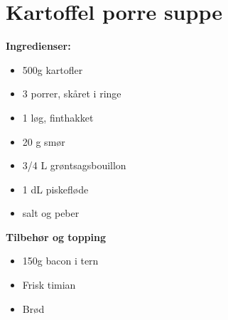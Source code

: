 \documentclass{book}
\begin{document}
\newpage
{}
\newpage \section{Kartoffel porre suppe}
\begin{minipage}[t]{0.5\textwidth}
\textbf{Ingredienser:}
\begin{itemize}
    \item 500g kartofler
    \item 3 porrer, skåret i ringe
    \item 1 løg, finthakket
    \item 20 g smør
    \item 3/4 L grøntsagsbouillon
    \item 1 dL piskefløde
    \item salt og peber
\end{itemize}
\textbf{Tilbehør og topping}
\begin{itemize}
    \item 150g bacon i tern
    \item Frisk timian
    \item Brød
\end{itemize}
\end{minipage}
\end{document}
